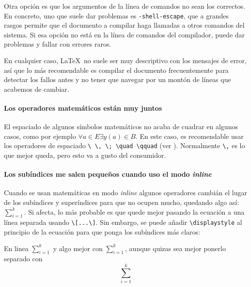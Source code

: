 Otra opción es que los argumentos de la línea de comandos no sean los correctos. En concreto, uno que suele dar problemas es \texttt{-shell-escape}, que a grandes rasgos permite que el documento a compilar haga llamadas a otros comandos del sistema. Si esa opción no está en la línea de comandos del compilador, puede dar problemas y fallar con errores raros.

En cualquier caso, \LaTeX\ no suele ser muy descriptivo con los mensajes de error, así que lo más recomendable es compilar el documento frecuentemente para detectar los fallos antes y no tener que navegar por un montón de líneas que acabemos de cambiar.

\paragraph{Los operadores matemáticos están muy juntos} El espaciado de algunos símbolos matemáticos no acaba de cuadrar en algunos casos, como por ejemplo $\forall a \in E \exists y(a) \in B$. En este caso, es recomendable usar los operadores de espaciado \verb|\ \, \; \quad \qquad| (ver ). Normalmente \verb|\,| es lo que mejor queda, pero esto va a gusto del consumidor.

\paragraph{Los subíndices me salen pequeños cuando uso el modo \textit{inline}} Cuando se usan matemáticas en modo \textit{inline} algunos operadores cambián el lugar de los subíndices y superíndices para que no ocupen mucho, quedando algo así: $\sum_{i=1}^k$. Si afecta, lo más probable es que quede mejor pasando la ecuación a una línea separada usando \verb|\[...\]|. Sin embargo, se puede añadir \verb|\displaystyle| al principio de la ecuación para que ponga los subíndices más claros:

\begin{LTXexample}[pos=r]
En linea $\sum_{i=1}^k$ y algo mejor
con $\displaystyle\sum_{i=1}^k$, aunque
quizas sea mejor ponerlo separado con
\[ \sum_{i=1}^k\]
\end{LTXexample}
